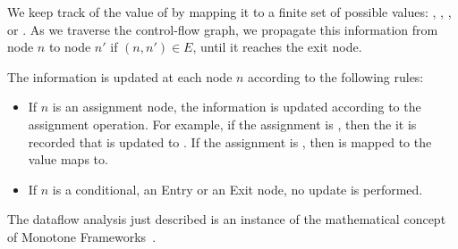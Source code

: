 We keep track of the value of  by mapping it to a finite set of possible values:
, , , or .
As we traverse the control-flow graph, we propagate this information from node
$n$ to node $n'$ if $(n,n')\in E$, until it reaches the exit node.

The information is updated at each node $n$ according to the following rules:
\begin{itemize}
\item If $n$ is an assignment node, the information is updated according to the
assignment operation. For example, if the assignment is , then the
it is recorded that  is updated to . If the assignment is , then
 is mapped to the value  maps to.
\item If $n$ is a conditional, an Entry or an Exit node, no update is performed.
\end{itemize}

The dataflow analysis just described is an instance of the mathematical concept of
Monotone Frameworks~\cite{Nielson2010Principles}.

